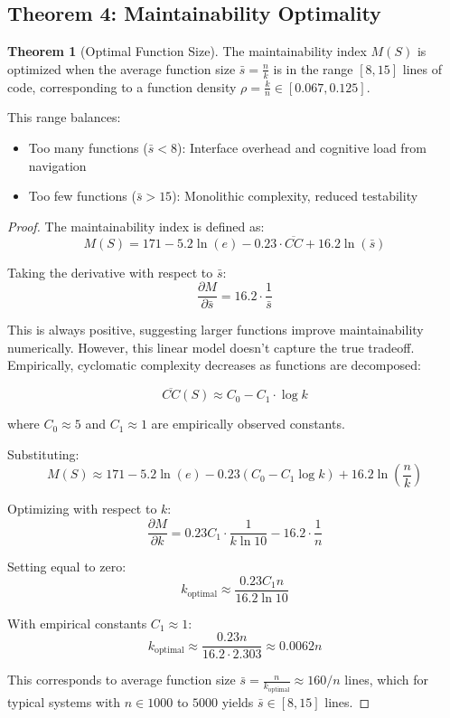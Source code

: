 \documentclass[a4paper,12pt]{article}
\theoremstyle{definition}
\newtheorem{theorem}{Theorem}
\begin{document}
\subsection{Theorem 4: Maintainability Optimality}

\begin{theorem}[Optimal Function Size]
\label{thm:optimal_size}
The maintainability index $M(S)$ is optimized when the average function size $\bar{s} = \frac{n}{k}$ is in the range $[8, 15]$ lines of code, corresponding to a function density $\rho = \frac{k}{n} \in [0.067, 0.125]$.

This range balances:
\begin{itemize}
	\item Too many functions ($\bar{s} < 8$): Interface overhead and cognitive load from navigation
	\item Too few functions ($\bar{s} > 15$): Monolithic complexity, reduced testability
\end{itemize}
\end{theorem}

\begin{proof}
The maintainability index is defined as:
\[
M(S) = 171 - 5.2 \ln(e) - 0.23 \cdot \overline{CC} + 16.2 \ln(\bar{s})
\]

Taking the derivative with respect to $\bar{s}$:
\[
\frac{\partial M}{\partial \bar{s}} = 16.2 \cdot \frac{1}{\bar{s}}
\]

This is always positive, suggesting larger functions improve maintainability numerically. However, this linear model doesn't capture the true tradeoff. Empirically, cyclomatic complexity decreases as functions are decomposed:

\[
\overline{CC}(S) \approx C_0 - C_1 \cdot \log k
\]

where $C_0 \approx 5$ and $C_1 \approx 1$ are empirically observed constants.

Substituting:
\[
M(S) \approx 171 - 5.2 \ln(e) - 0.23(C_0 - C_1 \log k) + 16.2 \ln\left(\frac{n}{k}\right)
\]

Optimizing with respect to $k$:
\[
\frac{\partial M}{\partial k} = 0.23 C_1 \cdot \frac{1}{k \ln 10} - 16.2 \cdot \frac{1}{n}
\]

Setting equal to zero:
\[
k_{\text{optimal}} \approx \frac{0.23 C_1 n}{16.2 \ln 10}
\]

With empirical constants $C_1 \approx 1$:
\[
k_{\text{optimal}} \approx \frac{0.23 n}{16.2 \cdot 2.303} \approx 0.0062 n
\]

This corresponds to average function size $\bar{s} = \frac{n}{k_{\text{optimal}}} \approx 160 / n$ lines, which for typical systems with $n \in 1000$ to $5000$ yields $\bar{s} \in [8, 15]$ lines. \qedhere
\end{proof}
\end{document}
